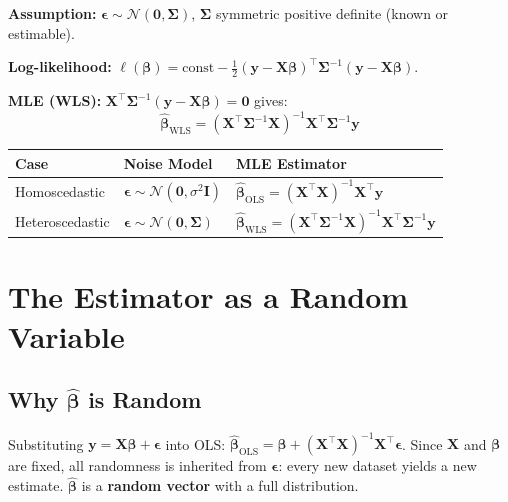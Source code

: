 \documentclass[11pt,a4paper]{article}
\begin{document}
\textbf{Assumption:} $\boldsymbol{\epsilon}\sim\mathcal{N}(\mathbf{0},\boldsymbol{\Sigma})$,
$\boldsymbol{\Sigma}$ symmetric positive definite (known or estimable).

\textbf{Log-likelihood:}
$\ell(\boldsymbol{\beta})=\text{const}-\tfrac{1}{2}(\mathbf{y}-\mathbf{X}\boldsymbol{\beta})^\top\boldsymbol{\Sigma}^{-1}(\mathbf{y}-\mathbf{X}\boldsymbol{\beta})$.

\textbf{MLE (WLS):} $\mathbf{X}^\top\boldsymbol{\Sigma}^{-1}(\mathbf{y}-\mathbf{X}\boldsymbol{\beta})=\mathbf{0}$ gives:
\begin{equation}
\boxed{\hat{\boldsymbol{\beta}}_{\mathrm{WLS}}=(\mathbf{X}^\top\boldsymbol{\Sigma}^{-1}\mathbf{X})^{-1}\mathbf{X}^\top\boldsymbol{\Sigma}^{-1}\mathbf{y}}
\end{equation}

\begin{center}\small
\begin{tabular}{lll}
\toprule
\textbf{Case} & \textbf{Noise Model} & \textbf{MLE Estimator} \\
\midrule
Homoscedastic & $\boldsymbol{\epsilon}\sim\mathcal{N}(\mathbf{0},\sigma^2\mathbf{I})$
              & $\hat{\boldsymbol{\beta}}_{\mathrm{OLS}}=(\mathbf{X}^\top\mathbf{X})^{-1}\mathbf{X}^\top\mathbf{y}$ \\[0.2em]
Heteroscedastic & $\boldsymbol{\epsilon}\sim\mathcal{N}(\mathbf{0},\boldsymbol{\Sigma})$
                & $\hat{\boldsymbol{\beta}}_{\mathrm{WLS}}=(\mathbf{X}^\top\boldsymbol{\Sigma}^{-1}\mathbf{X})^{-1}\mathbf{X}^\top\boldsymbol{\Sigma}^{-1}\mathbf{y}$ \\
\bottomrule
\end{tabular}
\end{center}

\section{The Estimator as a Random Variable}

\subsection{Why \texorpdfstring{$\hat{\boldsymbol{\beta}}$}{beta-hat} is Random}

Substituting $\mathbf{y}=\mathbf{X}\boldsymbol{\beta}+\boldsymbol{\epsilon}$ into OLS:
$\hat{\boldsymbol{\beta}}_{\mathrm{OLS}}=\boldsymbol{\beta}+(\mathbf{X}^\top\mathbf{X})^{-1}\mathbf{X}^\top\boldsymbol{\epsilon}$.
Since $\mathbf{X}$ and $\boldsymbol{\beta}$ are fixed, all randomness is inherited from $\boldsymbol{\epsilon}$:
every new dataset yields a new estimate. $\hat{\boldsymbol{\beta}}$ is a \textbf{random vector} with
a full distribution.
\end{document}
